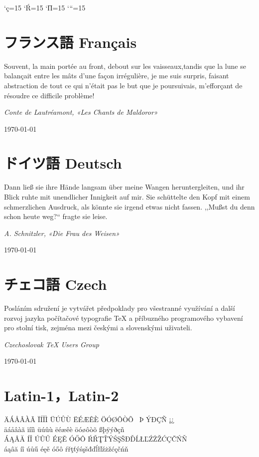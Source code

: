 \documentclass{ujarticle}
\begin{document}
\kcatcode`ç=15%
\kcatcode`Ŕ=15
\kcatcode`П=15
\kcatcode`“=15

\section{フランス語 Français}
Souvent, la main portée au front, debout sur les 
vaisseaux,tandis que la lune se balançait entre 
les mâts d'une façon irrégulière, je me suis surpris, 
faisant abstraction de tout ce qui n'était pas le but 
que je poursuivais, m'efforçant de résoudre ce 
difficile problème!

\hfill {\em Conte de Lautréamont, «Les Chants de Maldoror»}%
\qquad\qquad

\hfill\today


\section{ドイツ語 Deutsch}
Dann ließ sie ihre Hände langsam über meine Wangen
heruntergleiten, und ihr Blick ruhte mit unendlicher
Innigkeit auf mir.
Sie schüttelte den Kopf mit einem schmerzlichen Ausdruck,
als könnte sie irgend etwas nicht fassen.
,,Mußst du denn schon heute weg?{}`` 
fragte sie leise.

\hfill {\em A. Schnitzler, «Die Frau des Weisen»}%
\qquad\qquad

\hfill\today


%
\section{チェコ語 Czech}
Posláním sdružení je vytvářet předpoklady 
pro všestranné využívání a další rozvoj jazyka 
počítačové typografie \TeX{} a příbuzného programového 
vybavení pro stolní tisk, 
zejména mezi českými a slovenskými uživateli.

\hfill {\em Czechoslovak \TeX{} Users Group}%
\qquad\qquad

\hfill\today


\section{Latin-1，Latin-2}
ÄÁÅÂÀÃ ÏÍÎÌ ÜÚÛÙ ËÉÆÊÈ ÖÓØÔÒÕ ~Þ ÝÐÇÑ ¡¿\\
äáåâàã ïíîì üúûù ëéæêè öóøôòõ ßþÿýðçñ\\
ÁĄÂĂ ÍÎ Ú{Ů}Ű ÉĘĚ ÓŐÔ 
ŔŘŢŤÝŚŞŠĐĎĹŁĽŹŻŽĆÇČŃŇ\\
áąâă íî ú{ů}ű éęě óőô 
ŕřţťýśşšđďĺłľźżžćçčńň
\end{document}
